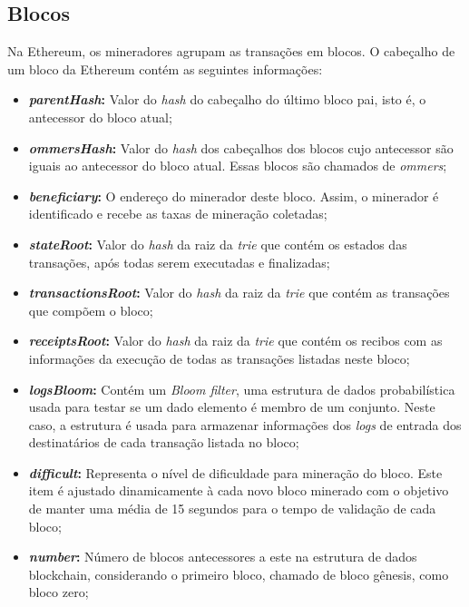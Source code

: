 
\subsection{Blocos} \label{tex:fund:ethereum:blocos}

Na Ethereum, os mineradores agrupam as transações em blocos. O cabeçalho de um bloco da Ethereum contém as seguintes informações:
\begin{itemize}
    \item \textbf{\textit{parentHash}:} Valor do \textit{hash} do cabeçalho do último bloco pai, isto é, o antecessor do bloco atual;
    \item \textbf{\textit{ommersHash}:} Valor do \textit{hash} dos cabeçalhos dos blocos cujo antecessor são iguais ao antecessor do bloco atual. Essas blocos são chamados de \textit{ommers}; 
    \item \textbf{\textit{beneficiary}:} O endereço do minerador deste bloco. Assim, o minerador é identificado e recebe as taxas de mineração coletadas;
    \item \textbf{\textit{stateRoot}:} Valor do \textit{hash} da raiz da \textit{trie} que contém os estados das transações, após todas serem executadas e finalizadas; 
    \item \textbf{\textit{transactionsRoot}:} Valor do \textit{hash} da raiz da \textit{trie} que contém as transações que compõem o bloco; 
    \item \textbf{\textit{receiptsRoot}:} Valor do \textit{hash} da raiz da \textit{trie} que contém os recibos com as informações da execução de todas as transações listadas neste bloco;
    \item \textbf{\textit{logsBloom}:} Contém um \textit{Bloom filter}, uma estrutura de dados probabilística usada para testar se um dado elemento é membro de um conjunto. Neste caso, a estrutura é usada para armazenar informações dos \textit{logs} de entrada dos destinatários de cada transação listada no bloco;
    \item \textbf{\textit{difficult}:} Representa o nível de dificuldade para mineração do bloco. Este item é ajustado dinamicamente à cada novo bloco minerado com o objetivo de manter uma média de 15 segundos para o tempo de validação de cada bloco;
    \item \textbf{\textit{number}:} Número de blocos antecessores a este na estrutura de dados blockchain, considerando o primeiro bloco, chamado de bloco gênesis, como bloco zero;

\end{itemize}
